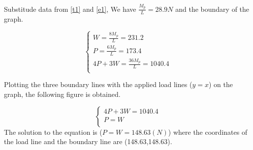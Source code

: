Substitude data from \autoref{t1} and \autoref{e1}, We have $\frac{M_p}{L}=28.9N$ and the boundary of the graph.

$$
\left\{ \begin{array}{l}
	W=\frac{8M_p}{L}=231.2\\
	P=\frac{6M_p}{L}=173.4\\
	4P+3W=\frac{36M_p}{L}=1040.4\\
\end{array} \right. 
$$

Plotting the three boundary lines with the applied load lines ($y=x$) on the graph, the following figure is obtained.

$$
\left\{ \begin{array}{l}
	4P+3W=1040.4\\
	P=W\\
\end{array} \right. 
$$
The solution to the equation is ($P=W=148.63(N)$)
where the coordinates of the load line and the boundary line are (148.63,148.63\label{ee}).


\fi




